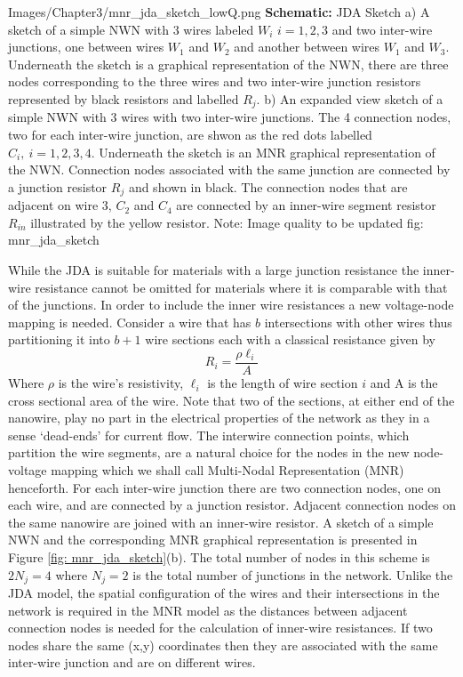 {Images/Chapter3/mnr_jda_sketch_lowQ.png}
{\textbf{Schematic:} JDA Sketch}
{ a) A sketch of a simple NWN with 3 wires labeled $W_i$ $i = 1,2,3$ and two inter-wire junctions, one between wires $W_1$ and $W_2$ and another between wires $W_1$ and $W_3$. Underneath the sketch is a graphical representation of the NWN, there are three nodes corresponding to the three wires and two inter-wire junction resistors represented by black resistors and labelled $R_j$. b) An expanded view sketch of a simple NWN with 3 wires with two inter-wire junctions. The 4 connection nodes, two for each inter-wire junction, are shwon as the red dots labelled $C_i, ~ i=1,2,3,4$. Underneath the sketch is an MNR graphical representation of the NWN. Connection nodes associated with the same junction are connected by a junction resistor $R_j$ and shown in black. The connection nodes that are adjacent on wire 3, $C_2$ and $C_4$ are connected by an inner-wire segment resistor $R_{in}$ illustrated by the yellow resistor. Note: Image quality to be updated}
{fig: mnr_jda_sketch}


While the JDA is suitable for materials with a large junction resistance the inner-wire resistance cannot be omitted for materials where it is comparable with that of the junctions. In order to include the inner wire resistances a new voltage-node mapping is needed. Consider a wire that has $b$ intersections with other wires thus partitioning it into $b+1$ wire sections each with a classical resistance given by 
\begin{equation}
R_i = \frac{\rho \ell_i}{A}
\end{equation}
Where $\rho$ is the wire's resistivity, $\ell_i$ is the length of wire section $i$ and A is the cross sectional area of the wire. Note that two of the sections, at either end of the nanowire, play no part in the electrical properties of the network as they in a sense `dead-ends' for current flow\cite{ocallaco2016}. The interwire connection points, which partition the wire segments, are a natural choice for the nodes in the new node-voltage mapping which we shall call Multi-Nodal Representation (MNR) henceforth. For each inter-wire junction there are two connection nodes, one on each wire, and are connected by a junction resistor. Adjacent connection nodes on the same nanowire are joined with an inner-wire resistor. A sketch of a simple NWN and the corresponding MNR graphical representation is presented in Figure \ref{fig: mnr_jda_sketch}(b). The total number of nodes in this scheme is $2 N_j=4$ where $N_j=2$ is the total number of junctions in the network. Unlike the JDA model, the spatial configuration of the wires and their intersections in the network is required in the MNR model as the distances between adjacent connection nodes is needed for the calculation of inner-wire resistances. If two nodes share the same (x,y) coordinates then they are associated with the same inter-wire junction and are on different wires. 

